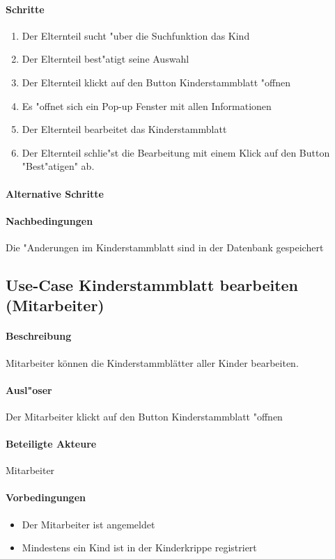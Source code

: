   \paragraph{Schritte}
  \begin{enumerate}
  	\item Der Elternteil sucht "uber die Suchfunktion das Kind
  	\item Der Elternteil best"atigt seine Auswahl
  	\item Der Elternteil klickt auf den Button \dq Kinderstammblatt "offnen\dq
  	\item Es "offnet sich ein Pop-up Fenster mit allen Informationen
  	\item Der Elternteil bearbeitet das Kinderstammblatt
  	\item Der Elternteil schlie"st die Bearbeitung mit einem Klick auf den Button "Best"atigen" ab. 
  \end{enumerate}

  \paragraph{Alternative Schritte}
  \paragraph{Nachbedingungen}
  Die "Anderungen im Kinderstammblatt sind in der Datenbank gespeichert
  
  
  \newpage
  \subsection{Use-Case Kinderstammblatt bearbeiten (Mitarbeiter)}
  \paragraph{Beschreibung}
  Mitarbeiter können die Kinderstammblätter aller Kinder bearbeiten. 
  \paragraph{Ausl"oser}
  Der Mitarbeiter klickt auf den Button \dq Kinderstammblatt "offnen\dq
  \paragraph{Beteiligte Akteure}   \leavevmode \newline
  Mitarbeiter
  \paragraph{Vorbedingungen}
  \begin{itemize}
  	\item Der Mitarbeiter ist angemeldet
  	\item Mindestens ein Kind ist in der Kinderkrippe registriert
  \end{itemize}
  
